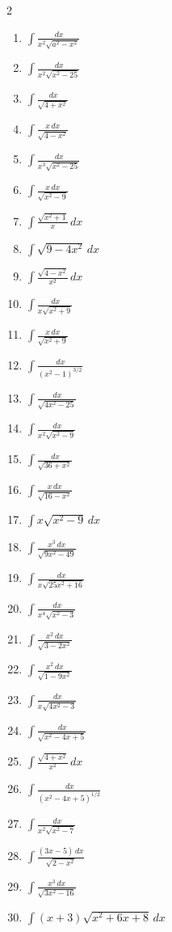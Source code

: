 \documentclass[12pt, letterpaper]{article}
\newcommand{\dx}{\,dx}
\begin{document}
\begin{multicols}{2}
\begin{enumerate}[leftmargin=*, resume]
  \item \medio{} $\int \frac{\dx}{x^2\sqrt{a^2-x^2}}$
  \item \medio{} $\int \frac{\dx}{x^2\sqrt{x^2-25}}$
  \item \facil{} $\int \frac{\dx}{\sqrt{4+x^2}}$
  \item \facil{} $\int \frac{x \dx}{\sqrt{4-x^2}}$
  \item \dificil{} $\int \frac{\dx}{x^3\sqrt{x^2-25}}$
  \item \facil{} $\int \frac{x \dx}{\sqrt{x^2-9}}$
  \item \medio{} $\int \frac{\sqrt{x^2+1}}{x} \dx$
  \item \medio{} $\int \sqrt{9-4x^2} \dx$
  \item \medio{} $\int \frac{\sqrt{4-x^2}}{x^2} \dx$
  \item \medio{} $\int \frac{\dx}{x\sqrt{x^2+9}}$
  \item \facil{} $\int \frac{x \dx}{\sqrt{x^2+9}}$
  \item \dificil{} $\int \frac{\dx}{(x^2-1)^{3/2}}$
  \item \medio{} $\int \frac{\dx}{\sqrt{4x^2-25}}$
  \item \medio{} $\int \frac{\dx}{x^2\sqrt{x^2-9}}$
  \item \facil{} $\int \frac{\dx}{\sqrt{36+x^2}}$
  \item \facil{} $\int \frac{x \dx}{\sqrt{16-x^2}}$
  \item \medio{} $\int x\sqrt{x^2-9} \dx$
  \item \dificil{} $\int \frac{x^3 \dx}{\sqrt{9x^2-49}}$
  \item \medio{} $\int \frac{\dx}{x\sqrt{25x^2+16}}$
  \item \dificil{} $\int \frac{\dx}{x^4\sqrt{x^2-3}}$
  \item \medio{} $\int \frac{x^2 \dx}{\sqrt{3-2x^2}}$
  \item \medio{} $\int \frac{x^2 \dx}{\sqrt{1-9x^2}}$
  \item \medio{} $\int \frac{\dx}{x\sqrt{4x^2-3}}$
  \item \dificil{} $\int \frac{\dx}{\sqrt{x^2-4x+5}}$
  \item \medio{} $\int \frac{\sqrt{4+x^2}}{x^2} \dx$
  \item \medio{} $\int \frac{\dx}{(x^2-4x+5)^{1/2}}$
  \item \medio{} $\int \frac{\dx}{x^2\sqrt{x^2-7}}$
  \item \dificil{} $\int \frac{(3x-5) \dx}{\sqrt{2-x^2}}$
  \item \dificil{} $\int \frac{x^3 \dx}{\sqrt{3x^2-16}}$
  \item \dificil{} $\int (x+3)\sqrt{x^2+6x+8} \dx$
\end{enumerate}
\end{multicols}
\end{document}
